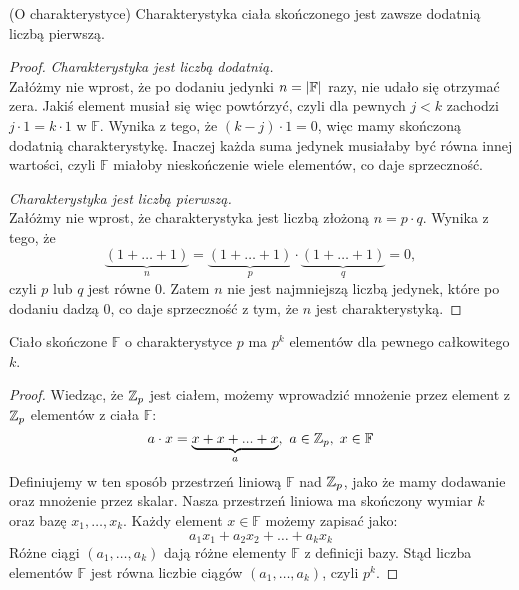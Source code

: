 \begin{theorem}(O charakterystyce)
Charakterystyka ciała skończonego jest zawsze dodatnią liczbą pierwszą.
\end{theorem}
\begin{proof}
    \textit{Charakterystyka jest liczbą dodatnią.} \\
    Załóżmy nie wprost, że po dodaniu jedynki \( n = \left\lvert\mathbb{F}\right\rvert \) razy, nie udało się otrzymać zera. Jakiś element musiał się więc powtórzyć, czyli dla pewnych \( j < k \) zachodzi \( j \cdot 1 = k \cdot 1 \) w \( \mathbb{F} \).
    Wynika z tego, że \( (k - j) \cdot 1 = 0 \), więc mamy skończoną dodatnią charakterystykę. Inaczej każda suma jedynek musiałaby być równa innej wartości, czyli \( \mathbb{F} \) miałoby nieskończenie wiele elementów, co daje sprzeczność.

    \textit{Charakterystyka jest liczbą pierwszą.} \\
    Załóżmy nie wprost, że charakterystyka jest liczbą złożoną \( n = p \cdot q \). Wynika z tego, że
    \[
        \underbrace{(1 + \dots + 1)}_n = \underbrace{(1 + \dots + 1)}_p \cdot \underbrace{(1 + \dots + 1)}_q = 0,
    \]
    czyli \( p \) lub \( q \) jest równe 0. Zatem \( n \) nie jest najmniejszą liczbą jedynek, które po dodaniu dadzą 0, co daje sprzeczność z tym, że \( n \) jest charakterystyką.
\end{proof}

\begin{theorem}
Ciało skończone \( \mathbb{F} \)  o charakterystyce \( p \) ma \( p^k \) elementów dla pewnego całkowitego \( k \).
\end{theorem}
 \begin{proof}
    Wiedząc, że \( \mathbb{Z}_p \) jest ciałem, możemy wprowadzić mnożenie przez element z \( \mathbb{Z}_p \) elementów z ciała \( \mathbb{F} \):
    \[
        a \cdot x = \underbrace{x + x + ... + x}_a, \ a \in \mathbb{Z}_p,\; x \in \mathbb{F}
    \]
    Definiujemy w ten sposób przestrzeń liniową \( \mathbb{F} \) nad \( \mathbb{Z}_p \), jako że mamy dodawanie oraz mnożenie przez skalar. Nasza przestrzeń liniowa ma skończony wymiar \( k \) oraz bazę \( x_1, \dots, x_k \).
    Każdy element \( x \in \mathbb{F} \) możemy zapisać jako:
    \[
        a_1x_1 + a_2x_2 + \dots + a_kx_k
    \]
    Różne ciągi \( (a_1, \dots, a_k) \) dają różne elementy \( \mathbb{F} \) z definicji bazy. Stąd liczba elementów \( \mathbb{F} \) jest równa liczbie ciągów \( (a_1, \dots, a_k) \), czyli \( p^k \).
\end{proof}
